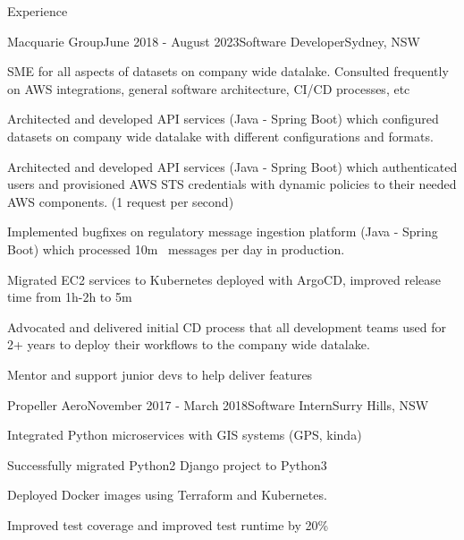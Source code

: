 \documentclass{resume} %
\begin{document}

\begin{rSection}{Experience}
    \begin{rSubsection}{Macquarie Group}{June 2018 - August 2023}{Software Developer}{Sydney, NSW}
    \item SME for all aspects of datasets on company wide datalake. Consulted frequently on AWS integrations, general software architecture, CI/CD processes, etc
    \item Architected and developed API services (Java - Spring Boot) which configured datasets on company wide datalake with different configurations and formats.
    \item Architected and developed API services (Java - Spring Boot) which authenticated users and provisioned AWS STS credentials with dynamic policies to their needed AWS components. (1 request per second)
    \item Implemented bugfixes on regulatory message ingestion platform (Java - Spring Boot) which processed 10m~ messages per day in production.
    \item Migrated EC2 services to Kubernetes deployed with ArgoCD, improved release time from 1h-2h to 5m~
    \item Advocated and delivered initial CD process that all development teams used for 2+ years to deploy their workflows to the company wide datalake.
    \item Mentor and support junior devs to help deliver features
    \end{rSubsection}

    \begin{rSubsection}{Propeller Aero}{November 2017 - March 2018}{Software Intern}{Surry Hills, NSW}
    \item Integrated Python microservices with GIS systems (GPS, kinda)
    \item Successfully migrated Python2 Django project to Python3
    \item Deployed Docker images using Terraform and Kubernetes.
    \item Improved test coverage and improved test runtime by 20\%
    \end{rSubsection}
    
    \end{rSection}
\end{document}
